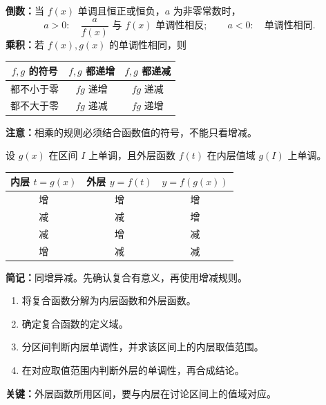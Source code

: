 \begin{frame}[label=Dreciprocal]
  \textbf{倒数：}当 $f(x)$ 单调且恒正或恒负，$a$ 为非零常数时，
  \[
  a>0:\quad \frac a{f(x)}\text{ 与 }f(x)\text{ 单调性相反};\qquad
  a<0:\quad \text{单调性相同}.
  \]
  \pause
  \textbf{乘积：}若 $f(x),g(x)$ 的单调性相同，则
  \begin{center}
  \renewcommand{\arraystretch}{1.3}
  \begin{tabular}{c|c|c}
    $f,g$ 的符号 & $f,g$ 都递增 & $f,g$ 都递减\\\hline
    都不小于零 & $fg$ 递增 & $fg$ 递减\\
    都不大于零 & $fg$ 递减 & $fg$ 递增
  \end{tabular}
  \end{center}
  \pause
  \par\vspace{0.1cm}
  \textbf{注意：}相乘的规则必须结合函数值的符号，不能只看增减。
\end{frame}

\begin{frame}[label=Dcomposition]
  设 $g(x)$ 在区间 $I$ 上单调，且外层函数 $f(t)$ 在内层值域 $g(I)$ 上单调。
  \begin{center}
  \renewcommand{\arraystretch}{1.4}
  \begin{tabular}{c|c|c}
    内层 $t=g(x)$ & 外层 $y=f(t)$ & $y=f(g(x))$\\\hline
    增 & 增 & 增\\
    减 & 减 & 增\\
    减 & 增 & 减\\
    增 & 减 & 减
  \end{tabular}
  \end{center}
  \pause
  \textbf{简记：}同增异减。\quad 先确认复合有意义，再使用增减规则。
\end{frame}

\begin{frame}[label=Dsteps]
  \begin{enumerate}
    \item 将复合函数分解为内层函数和外层函数。
    \item 确定复合函数的定义域。
    \item 分区间判断内层单调性，并求该区间上的内层取值范围。
    \item 在对应取值范围内判断外层的单调性，再合成结论。
  \end{enumerate}
  \pause
  \par\vspace{0.2cm}
  \textbf{关键：}外层函数所用区间，要与内层在讨论区间上的值域对应。
\end{frame}


